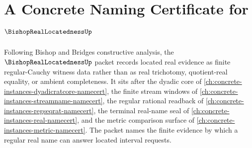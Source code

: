 \chapter{A Concrete Naming Certificate for $\BishopRealLocatednessUp$}
\label{ch:concrete-instances-bishop-real-locatedness-namecert}

Following Bishop and Bridges constructive analysis, the $\BishopRealLocatednessUp$ packet records located real evidence as finite regular-Cauchy witness data rather than as real trichotomy, quotient-real equality, or ambient completeness. It sits after the dyadic core of \autoref{ch:concrete-instances-dyadicratcore-namecert}, the finite stream windows of \autoref{ch:concrete-instances-streamname-namecert}, the regular rational readback of \autoref{ch:concrete-instances-regseqrat-namecert}, the terminal real-name seal of \autoref{ch:concrete-instances-real-namecert}, and the metric comparison surface of \autoref{ch:concrete-instances-metric-namecert}. The packet names the finite evidence by which a regular real name can answer located interval requests.

